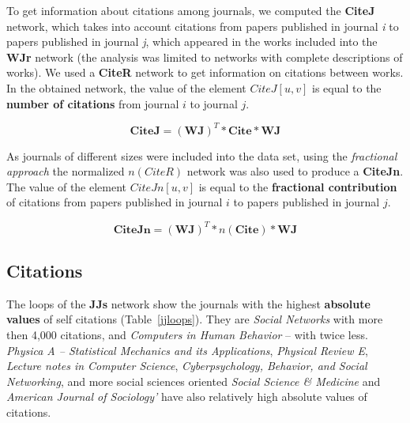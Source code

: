 \documentclass[11pt]{article} %
\begin{document}
To get information about citations among journals, we computed the \textbf{CiteJ} network, which takes into account citations from papers published in journal \textit{i} to papers published in journal \textit{j}, which appeared in the works included into the \textbf{WJr} network (the analysis was limited to networks with complete descriptions of works). We used a \textbf{CiteR} network to get information on citations between works. In the obtained network, the value of the element $CiteJ[u,v]$ is equal to the \textbf{number of citations} from journal $i$ to journal $j$. \smallskip

\[ \mathbf{CiteJ} = (\mathbf{WJ}) ^ T * \mathbf{Cite} * \mathbf{WJ} \] 

As journals of different sizes were included into the data set, using the \textit{fractional approach} the normalized  $n(CiteR)$ network was also used to produce a \textbf{CiteJn}. The value of the element $CiteJn[u,v]$ is equal to the \textbf{fractional contribution} of citations from papers published in journal $i$ to papers published in journal $j$. \medskip 

\[ \mathbf{CiteJn} = (\mathbf{WJ}) ^ T * n(\mathbf{Cite}) * \mathbf{WJ} \]  
 

\subsection{Citations}

The loops of the \textbf{JJs} network show the journals with the highest \textbf{absolute values} of self citations (Table~\ref{jjloops}). They are \textit{Social Networks} with more then 4,000 citations, and \textit{Computers in Human Behavior} -- with twice less. \textit{Physica A -- Statistical Mechanics and its Applications}, \textit{Physical Review E}, \textit{Lecture notes in Computer Science}, \textit{Cyberpsychology, Behavior, and Social Networking}, and more social sciences oriented \textit{Social Science \& Medicine} and \textit{American Journal of Sociology'} have also relatively high absolute values of citations. \medskip 
\end{document}
